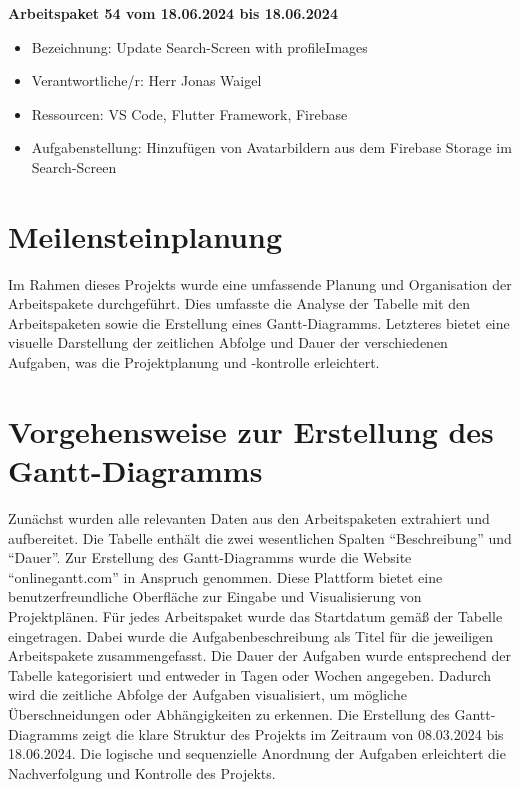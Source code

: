 \textbf{Arbeitspaket 54 vom 18.06.2024 bis 18.06.2024}
\begin{itemize}[itemsep=0pt]
    \item{Bezeichnung: Update Search-Screen with profileImages} 
	\item{Verantwortliche/r: Herr Jonas Waigel} 
	\item{Ressourcen: VS Code, Flutter Framework, Firebase} 
    \item{Aufgabenstellung: Hinzufügen von Avatarbildern aus dem Firebase Storage im Search-Screen}
\end{itemize}

\section{Meilensteinplanung}
Im Rahmen dieses Projekts wurde eine umfassende Planung und Organisation der Arbeitspakete durchgeführt. 
Dies umfasste die Analyse der Tabelle mit den Arbeitspaketen sowie die Erstellung eines Gantt-Diagramms. 
Letzteres bietet eine visuelle Darstellung der zeitlichen Abfolge und Dauer der verschiedenen Aufgaben, was die Projektplanung und -kontrolle erleichtert.

\section{Vorgehensweise zur Erstellung des Gantt-Diagramms}
Zunächst wurden alle relevanten Daten aus den Arbeitspaketen extrahiert und aufbereitet.
Die Tabelle enthält die zwei wesentlichen Spalten \enquote{Beschreibung} und \enquote{Dauer}.
Zur Erstellung des Gantt-Diagramms wurde die Website \enquote{onlinegantt.com} in Anspruch genommen.
Diese Plattform bietet eine benutzerfreundliche Oberfläche zur Eingabe und Visualisierung von Projektplänen.\newline
Für jedes Arbeitspaket wurde das Startdatum gemäß der Tabelle eingetragen.
Dabei wurde die Aufgabenbeschreibung als Titel für die jeweiligen Arbeitspakete zusammengefasst.
Die Dauer der Aufgaben wurde entsprechend der Tabelle kategorisiert und entweder in Tagen oder Wochen angegeben.\newline
Dadurch wird die zeitliche Abfolge der Aufgaben visualisiert, um mögliche Überschneidungen oder Abhängigkeiten zu erkennen. 
Die Erstellung des Gantt-Diagramms zeigt die klare Struktur des Projekts im Zeitraum von 08.03.2024 bis 18.06.2024. 
Die logische und sequenzielle Anordnung der Aufgaben erleichtert die Nachverfolgung und Kontrolle des Projekts.

